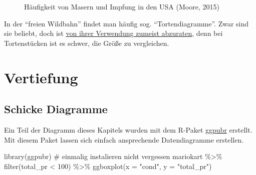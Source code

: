 \documentclass[
  letterpaper,
  oneside,
  open=any]{scrbook}
\newenvironment{Shaded}{\begin{snugshade}}{\end{snugshade}}
\newcommand{\AttributeTok}[1]{\textcolor[rgb]{0.40,0.45,0.13}{#1}}
\newcommand{\CommentTok}[1]{\textcolor[rgb]{0.37,0.37,0.37}{#1}}
\newcommand{\DecValTok}[1]{\textcolor[rgb]{0.68,0.00,0.00}{#1}}
\newcommand{\FunctionTok}[1]{\textcolor[rgb]{0.28,0.35,0.67}{#1}}
\newcommand{\NormalTok}[1]{\textcolor[rgb]{0.00,0.23,0.31}{#1}}
\newcommand{\SpecialCharTok}[1]{\textcolor[rgb]{0.37,0.37,0.37}{#1}}
\newcommand{\StringTok}[1]{\textcolor[rgb]{0.13,0.47,0.30}{#1}}
\theoremstyle{definition}
\theoremstyle{definition}
\theoremstyle{definition}
\theoremstyle{remark}
\begin{document}
\begin{figure}


\caption{\label{fig-vaccine}Häufigkeit von Masern und Impfung in den USA
(Moore, 2015)}

\end{figure}%

In der \enquote{freien Wildbahn} findet man häufig sog.
\enquote{Tortendiagramme}. Zwar sind sie beliebt, doch ist
\href{https://www.data-to-viz.com/caveat/pie.html}{von ihrer Verwendung
zumeist abzuraten}, denn bei Tortenstücken ist es schwer, die Größe zu
vergleichen.

\section{Vertiefung}\label{vertiefung-4}

\subsection{Schicke Diagramme}\label{schicke-diagramme}

Ein Teil der Diagramm dieses Kapitels wurden mit dem R-Paket
\href{https://rpkgs.datanovia.com/ggpubr/}{ggpubr} erstellt. Mit diesem
Paket lassen sich einfach ansprechende Datendiagramme erstellen.

\begin{Shaded}
\begin{Highlighting}[]
\FunctionTok{library}\NormalTok{(ggpubr)  }\CommentTok{\# einmalig instalieren nicht vergessen}
\NormalTok{mariokart }\SpecialCharTok{\%\textgreater{}\%} 
  \FunctionTok{filter}\NormalTok{(total\_pr }\SpecialCharTok{\textless{}} \DecValTok{100}\NormalTok{) }\SpecialCharTok{\%\textgreater{}\%} 
  \FunctionTok{ggboxplot}\NormalTok{(}\AttributeTok{x =} \StringTok{"cond"}\NormalTok{, }\AttributeTok{y =} \StringTok{"total\_pr"}\NormalTok{)}
\end{Highlighting}
\end{Shaded}
\end{document}

